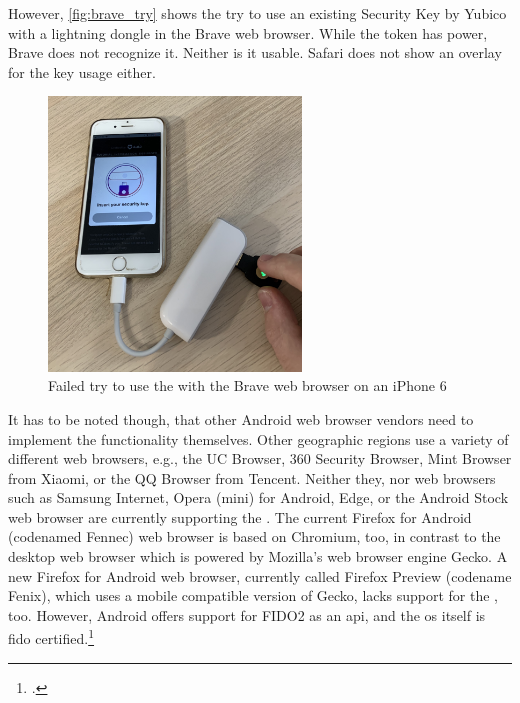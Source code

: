 However, \autoref{fig:brave_try} shows the try to use an existing Security Key by Yubico with a lightning dongle in the Brave web browser. While the token has power, Brave does not recognize it. Neither is it usable. Safari does not show an overlay for the key usage either.

\begin{figure}[hbt]
	\centering
	\includegraphics[width=0.6\textwidth]{pics/brave_try_dongle.eps}
	\caption[Failed try to use the \wa{} with the Brave web browser on an iPhone 6]{Failed try to use the \wa{} with the Brave web browser on an iPhone 6\footnotemark}
	\label{fig:brave_try}
\end{figure}

It has to be noted though, that other Android web browser vendors need to implement the functionality themselves. Other geographic regions use a variety of different web browsers, e.g., the UC Browser, 360 Security Browser, Mint Browser from Xiaomi, or the QQ Browser from Tencent. Neither they, nor web browsers such as Samsung Internet, Opera (mini) for Android, Edge, or the Android Stock web browser are currently supporting the \wa. The current Firefox for Android (codenamed \frqq Fennec\flqq) web browser is based on Chromium, too, in contrast to the desktop web browser which is powered by Mozilla's web browser engine Gecko. A new Firefox for Android web browser, currently called Firefox Preview (codename \frqq Fenix\flqq), which uses a mobile compatible version of Gecko, lacks support for the \wa, too. However, Android offers support for FIDO2 as an \gls{api}, and the \gls{os} itself is \gls{fido} certified.\footcites[See][24]{fido-ct-3}[See][22]{fido-ct-3}

